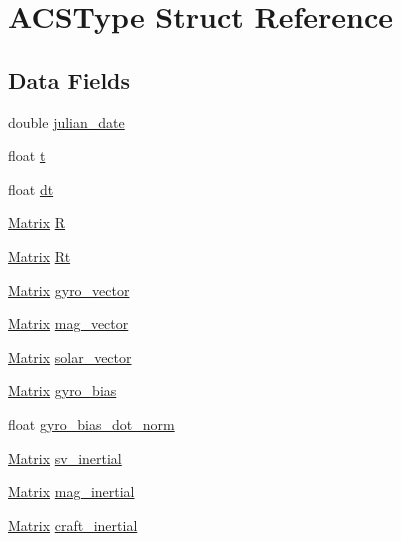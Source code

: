 \hypertarget{struct_a_c_s_type}{}\section{A\+C\+S\+Type Struct Reference}
\label{struct_a_c_s_type}
\subsection*{Data Fields}
\begin{DoxyCompactItemize}
\item 
double \mbox{\hyperlink{struct_a_c_s_type_a511e2e3264766d560a8f6cb81ac45fc9}{julian\+\_\+date}}
\item 
float \mbox{\hyperlink{struct_a_c_s_type_afea36502e9d227ff62c5fb2719a246f2}{t}}
\item 
float \mbox{\hyperlink{struct_a_c_s_type_a778e38aa889751afffa2dea6b803e67a}{dt}}
\item 
\mbox{\hyperlink{struct___matrix}{Matrix}} \mbox{\hyperlink{struct_a_c_s_type_a72851c393b49a2b488e51a678b90135b}{R}}
\item 
\mbox{\hyperlink{struct___matrix}{Matrix}} \mbox{\hyperlink{struct_a_c_s_type_a9b4fd46706c2ce0ad8a2df8038ac915e}{Rt}}
\item 
\mbox{\hyperlink{struct___matrix}{Matrix}} \mbox{\hyperlink{struct_a_c_s_type_a6db622f43cefd0fe0f05ddbb5553ce71}{gyro\+\_\+vector}}
\item 
\mbox{\hyperlink{struct___matrix}{Matrix}} \mbox{\hyperlink{struct_a_c_s_type_a4b82b0a178354dcc8761b1bc5d9e3e90}{mag\+\_\+vector}}
\item 
\mbox{\hyperlink{struct___matrix}{Matrix}} \mbox{\hyperlink{struct_a_c_s_type_a2565c37ca09278f1f6e2405328e94bc8}{solar\+\_\+vector}}
\item 
\mbox{\hyperlink{struct___matrix}{Matrix}} \mbox{\hyperlink{struct_a_c_s_type_a4041a720dac4049e6c883ed9b0d654ba}{gyro\+\_\+bias}}
\item 
float \mbox{\hyperlink{struct_a_c_s_type_ad98a2f8a4a88a5e48b648bf1d56494cc}{gyro\+\_\+bias\+\_\+dot\+\_\+norm}}
\item 
\mbox{\hyperlink{struct___matrix}{Matrix}} \mbox{\hyperlink{struct_a_c_s_type_af56596ec9fe0cf9632dd40932883191e}{sv\+\_\+inertial}}
\item 
\mbox{\hyperlink{struct___matrix}{Matrix}} \mbox{\hyperlink{struct_a_c_s_type_a3b8cd1112080cab70c421f3147c4610a}{mag\+\_\+inertial}}
\item 
\mbox{\hyperlink{struct___matrix}{Matrix}} \mbox{\hyperlink{struct_a_c_s_type_a5840add97f160c6362779a0651f8d47e}{craft\+\_\+inertial}}

\end{DoxyCompactItemize}
